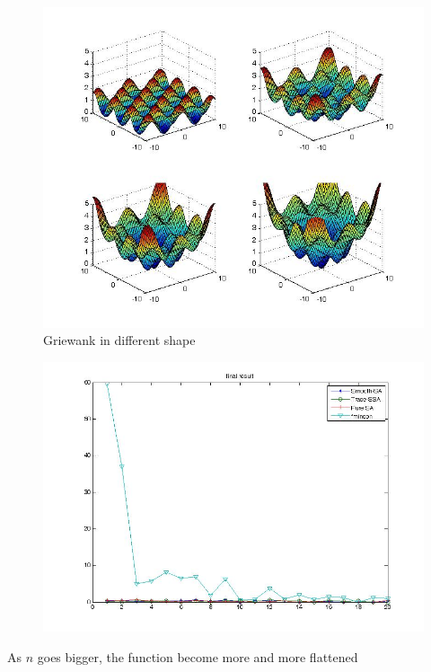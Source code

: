 \documentclass[hyperref={pdfpagelabels=false}]{beamer}
\begin{document}

\begin{frame}
\begin{figure}
\includegraphics[scale=0.33]{diffp.jpg}
\caption{Griewank in different shape}
\end{figure}
\end{frame}


\begin{frame}
\begin{figure}
\includegraphics[scale=0.3]{result2.jpg}
\end{figure}
As $n$ goes bigger, the function become more and more flattened
\end{frame}
\end{document}
